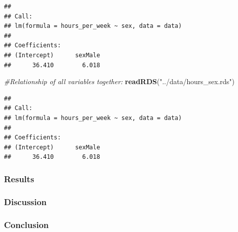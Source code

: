 \documentclass[]{article}
\newenvironment{Shaded}{\begin{snugshade}}{\end{snugshade}}
\newcommand{\CommentTok}[1]{\textcolor[rgb]{0.56,0.35,0.01}{\textit{#1}}}
\newcommand{\KeywordTok}[1]{\textcolor[rgb]{0.13,0.29,0.53}{\textbf{#1}}}
\newcommand{\NormalTok}[1]{#1}
\newcommand{\StringTok}[1]{\textcolor[rgb]{0.31,0.60,0.02}{#1}}
\begin{document}
\begin{verbatim}
## 
## Call:
## lm(formula = hours_per_week ~ sex, data = data)
## 
## Coefficients:
## (Intercept)      sexMale  
##      36.410        6.018
\end{verbatim}

\begin{Shaded}
\begin{Highlighting}[]
  \CommentTok{\#Relationship of all variables together:}
\KeywordTok{readRDS}\NormalTok{(}\StringTok{"../data/hours\_sex.rds"}\NormalTok{)}
\end{Highlighting}
\end{Shaded}

\begin{verbatim}
## 
## Call:
## lm(formula = hours_per_week ~ sex, data = data)
## 
## Coefficients:
## (Intercept)      sexMale  
##      36.410        6.018
\end{verbatim}

\hypertarget{results}{%
\subsubsection{Results}\label{results}}

\hypertarget{discussion}{%
\subsubsection{Discussion}\label{discussion}}

\hypertarget{conclusion}{%
\subsubsection{Conclusion}\label{conclusion}}
\end{document}
